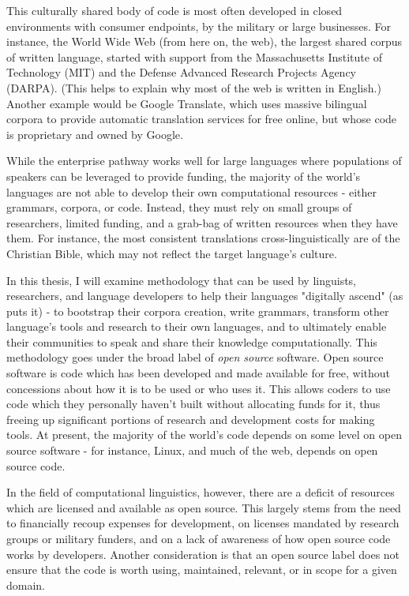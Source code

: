 This culturally shared body of code is most often developed in closed environments with consumer endpoints, by the military or large businesses. For instance, the World Wide Web (from here on, the web), the largest shared corpus of written language, started with support from  the Massachusetts Institute of Technology (MIT) and the Defense Advanced Research Projects Agency (DARPA). (This helps to explain why most of the web is written in English.) Another example would be Google Translate, which uses massive bilingual corpora to provide automatic translation services for free online, but whose code is proprietary and owned by Google.

While the enterprise pathway works well for large languages where populations of speakers can be leveraged to provide funding, the majority of the world's languages are not able to develop their own computational resources - either grammars, corpora, or code. Instead, they must rely on small groups of researchers, limited funding, and a grab-bag of written resources when they have them. For instance, the most consistent translations cross-linguistically are of the Christian Bible, which may not reflect the target language's culture.

In this thesis, I will examine methodology that can be used by linguists, researchers, and language developers to help their languages "digitally ascend" (as \citet{kornai2013digital} puts it) - to bootstrap their corpora creation, write grammars, transform other language's tools and research to their own languages, and to ultimately enable their communities to speak and share their knowledge computationally. This methodology goes under the broad label of \textit{open source} software. Open source software is code which has been developed and made available for free, without concessions about how it is to be used or who uses it. This allows coders to use code which they personally haven't built without allocating funds for it, thus freeing up significant portions of research and development costs for making tools. At present, the majority of the world's code depends on some level on open source software - for instance, Linux, and much of the web, depends on open source code.

In the field of computational linguistics, however, there are a deficit of resources which are licensed and available as open source. This largely stems from the need to financially recoup expenses for development, on licenses mandated by research groups or military funders, and on a lack of awareness of how open source code works by developers. Another consideration is that an open source label does not ensure that the code is worth using, maintained, relevant, or in scope for a given domain.

